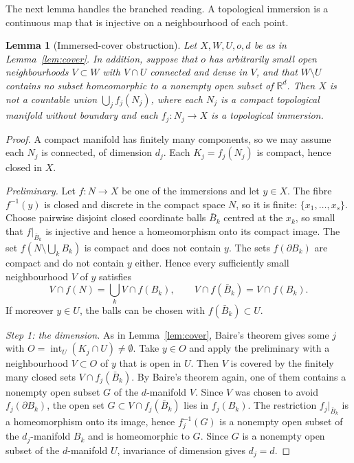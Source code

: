 \documentclass[11pt,a4paper]{article}
\newtheorem{lemma}[theorem]{Lemma}
\theoremstyle{definition}\newtheorem{conjecture}{Conjecture}
\theoremstyle{remark}\newtheorem{remark}[theorem]{Remark}
\newcommand{\R}{\mathbb R}
\DeclareMathOperator{\interior}{int}
\begin{document}
The next lemma handles the branched reading. A topological immersion is a continuous map that is injective on a neighbourhood of each point.

\begin{lemma}[Immersed-cover obstruction]\label{lem:immersed}
Let $X,W,U,o,d$ be as in Lemma~\ref{lem:cover}. In addition, suppose that $o$ has arbitrarily small open neighbourhoods $V\subset W$ with $V\cap U$ connected and dense in $V$, and that $W\setminus U$ contains no subset homeomorphic to a nonempty open subset of $\R^d$. Then $X$ is not a countable union $\bigcup_jf_j(N_j)$, where each $N_j$ is a compact topological manifold without boundary and each $f_j:N_j\to X$ is a topological immersion.
\end{lemma}
\begin{proof}
A compact manifold has finitely many components, so we may assume each $N_j$ is connected, of dimension $d_j$. Each $K_j=f_j(N_j)$ is compact, hence closed in $X$.

\emph{Preliminary.} Let $f:N\to X$ be one of the immersions and let $y\in X$. The fibre $f^{-1}(y)$ is closed and discrete in the compact space $N$, so it is finite: $\{x_1,\dots,x_s\}$. Choose pairwise disjoint closed coordinate balls $\bar B_k$ centred at the $x_k$, so small that $f|_{\bar B_k}$ is injective and hence a homeomorphism onto its compact image. The set $f(N\setminus\bigcup_kB_k)$ is compact and does not contain $y$. The sets $f(\partial B_k)$ are compact and do not contain $y$ either. Hence every sufficiently small neighbourhood $V$ of $y$ satisfies
\begin{equation}\label{eq:sheets}
 V\cap f(N)=\bigcup_k V\cap f(B_k),\qquad V\cap f(\bar B_k)=V\cap f(B_k).
\end{equation}
If moreover $y\in U$, the balls can be chosen with $f(\bar B_k)\subset U$.

\emph{Step 1: the dimension.} As in Lemma~\ref{lem:cover}, Baire's theorem gives some $j$ with $O=\interior_U(K_j\cap U)\neq\emptyset$. Take $y\in O$ and apply the preliminary with a neighbourhood $V\subset O$ of $y$ that is open in $U$. Then $V$ is covered by the finitely many closed sets $V\cap f_j(\bar B_k)$. By Baire's theorem again, one of them contains a nonempty open subset $G$ of the $d$-manifold $V$. Since $V$ was chosen to avoid $f_j(\partial B_k)$, the open set $G\subset V\cap f_j(\bar B_k)$ lies in $f_j(B_k)$. The restriction $f_j|_{\bar B_k}$ is a homeomorphism onto its image, hence $f_j^{-1}(G)$ is a nonempty open subset of the $d_j$-manifold $B_k$ and is homeomorphic to $G$. Since $G$ is a nonempty open subset of the $d$-manifold $U$, invariance of dimension gives $d_j=d$.


\end{proof}
\end{document}
